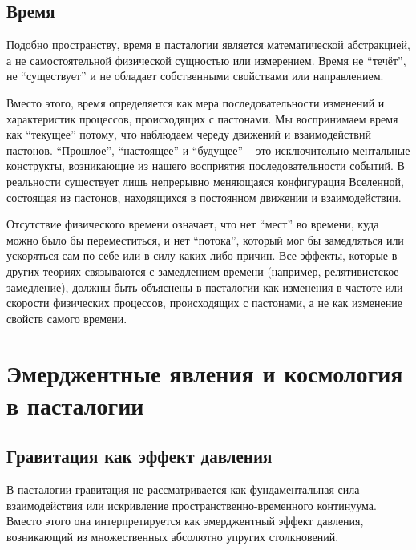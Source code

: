 \documentclass[pdflatex,sn-mathphys-num]{sn-jnl}
\begin{document}
\subsection{Время}\label{subsec:time}

Подобно пространству, время в пасталогии является математической абстракцией, а не самостоятельной физической сущностью или измерением. Время не ``течёт'', не ``существует'' и не обладает собственными свойствами или направлением.

Вместо этого, время определяется как мера последовательности изменений и характеристик процессов, происходящих с пастонами. Мы воспринимаем время как ``текущее'' потому, что наблюдаем череду движений и взаимодействий пастонов. ``Прошлое'', ``настоящее'' и ``будущее'' -- это исключительно ментальные конструкты, возникающие из нашего восприятия последовательности событий. В реальности существует лишь непрерывно меняющаяся конфигурация Вселенной, состоящая из пастонов, находящихся в постоянном движении и взаимодействии.

Отсутствие физического времени означает, что нет ``мест'' во времени, куда можно было бы переместиться, и нет ``потока'', который мог бы замедляться или ускоряться сам по себе или в силу каких-либо причин. Все эффекты, которые в других теориях связываются с замедлением времени (например, релятивистское замедление), должны быть объяснены в пасталогии как изменения в частоте или скорости физических процессов, происходящих с пастонами, а не как изменение свойств самого времени.

\section{Эмерджентные явления и космология в пасталогии}\label{sec:emergent-cosmology}

\subsection{Гравитация как эффект давления}\label{subsec:gravity-pressure}

В пасталогии гравитация не рассматривается как фундаментальная сила взаимодействия или искривление пространственно-временного континуума. Вместо этого она интерпретируется как эмерджентный эффект давления, возникающий из множественных абсолютно упругих столкновений.
\end{document}
